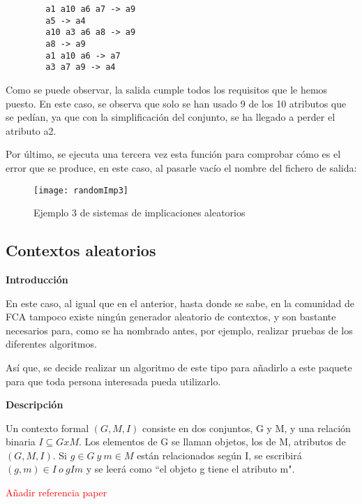    \begin{verbatim}
        a1 a10 a6 a7 -> a9 
        a5 -> a4 
        a10 a3 a6 a8 -> a9 
        a8 -> a9 
        a1 a10 a6 -> a7 
        a3 a7 a9 -> a4 
    \end{verbatim}
    Como se puede observar, la salida cumple todos los requisitos que le hemos puesto. En este caso, se observa que solo se han usado 9 de 
    los 10 atributos que se ped\'ian, ya que con la simplificaci\'on del conjunto, se ha llegado a perder el atributo a2.
    \\
    
    \bigskip

    Por \'ultimo, se ejecuta una tercera vez esta funci\'on para comprobar c\'omo es el error que se produce, en este caso, al pasarle vac\'io 
    el nombre del fichero de salida:

    \begin{figure}[H]
        \centering
        \texttt{[image: randomImp3]}
        \caption{Ejemplo 3 de sistemas de implicaciones aleatorios}
        \label{fig:randomImp3}
    \end{figure}

    \clearpage


\subsection{Contextos aleatorios}

    \textbf{Introducci\'on}

    En este caso, al igual que en el anterior, hasta donde se sabe, en la comunidad de FCA tampoco existe ning\'un generador aleatorio de 
    contextos, y son bastante necesarios para, como se ha nombrado antes, por ejemplo, realizar pruebas de los diferentes algoritmos.

    As\'i que, se decide realizar un algoritmo de este tipo para a\~nadirlo a este paquete para que toda persona interesada pueda 
    utilizarlo.
    

    \textbf{Descripci\'on}

    Un contexto formal \( (G, M, I) \) consiste en dos conjuntos, G y M, y una relaci\'on binaria \( I \subseteq G x M \). Los elementos 
    de G se llaman objetos, los de M, atributos de \( (G, M, I) \). Si \(g \in G ~ y ~ m \in M \) est\'an relacionados seg\'un I, se escribir\'a 
    \( (g,m) \in I ~ o ~ g I m \) y se leer\'a como ``el objeto g tiene el atributo m".

    \textcolor{red}{A\~nadir referencia paper}


